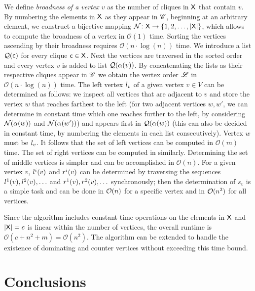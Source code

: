 \documentclass[10pt]{article}
\newcommand{\svv}{s_v}
\begin{document}
We define \emph{broadness of a vertex $v$} as the number of cliques 
in $\mc{X}$ that contain $v$.
By numbering the elements in $\mc{X}$ as they appear in $\ri{C}$, beginning at 
an arbitrary element, we construct a bijective mapping 
$\fu{N}\colon\mc{X}\rightarrow\{1,2,\ldots,|\mc{X}|\}$, which allows to compute the 
broadness of a vertex in  $\mathcal{O}(1)$ time.
Sorting the vertices ascending by their broadness 
requires $\mathcal{O}(n\cdot\log(n))$ time. We introduce a list $\fu{Q}(\mc{c})$ for 
every clique $\mc{c}\in\mc{X}$. Next the vertices are traversed in the sorted order and 
every vertex $v$ is added to list $\fu{Q}(\lc{v})$.
By concatenating the lists as their respective cliques appear in $\ri{C}$ we obtain the vertex order
$\ri{L}$ in $\mathcal{O}(n\cdot\log(n))$ time.
The left vertex $\lvv$ of a given vertex $v\in V$ can be determined as follows:
we inspect all vertices that are adjacent to $v$ and store the vertex $w$ that reaches 
farthest to the left (for two adjacent vertices $w,w'$, we can determine in constant time 
which one reaches further to the left, by considering $\fu{N}(\lc{w})$ and $\fu{N}(\lc{w'})$) 
and appears first in $\fu{Q}(\lc{w})$ (this can also be decided in constant time, by numbering 
the elements in each list consecutively). Vertex $w$ must be $\lvv$.
It follows that the set of left vertices can be computed in $\mathcal{O}(m)$ time.
The set of right vertices can be computed in similarly.
Determining the set of middle vertices is simpler and can be accomplished in 
$\mathcal{O}(n)$.
For a given vertex $v$, $\lvi{v}{i}$ and $\rvi{v}{i}$ can be determined by traversing 
the sequences $\lvi{v}{1},\lvi{v}{2},\ldots$ and $\rvi{v}{1},\rvi{v}{2},\ldots$ synchronously; 
then the determination of  $\svv$ is a simple task and can be done in $\fu{O}(n)$
for a specific vertex and in $\fu{O}(n^2)$ for all vertices.

Since the algorithm includes constant time operations on the elements in $\mc{X}$ 
and $|\mc{X}|=c$ is linear within the number of vertices, the overall runtime 
is $\mathcal{O}(c+n^2+m)=\mathcal{O}(n^2)$.
The algorithm can be extended to  handle the existence of dominating 
and counter vertices without exceeding this time bound.







\section{Conclusions}\label{conc}
\end{document}
